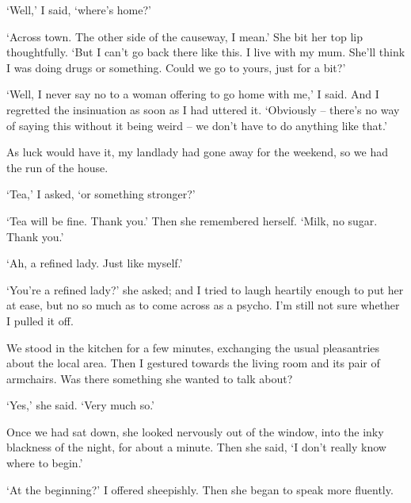 `Well,' I said, `where's home?'

`Across town. The other side of the causeway, I mean.' She bit her top lip thoughtfully. `But I can't go back there like this. I live with my mum. She'll think I was doing drugs or something. Could we go to yours, just for a bit?'

`Well, I never say no to a woman offering to go home with me,' I said. And I regretted the insinuation as soon as I had uttered it. `Obviously -- there's no way of saying this without it being weird -- we don't have to do anything like that.'

\divsep

As luck would have it, my landlady had gone away for the weekend, so we had the run of the house.

`Tea,' I asked, `or something stronger?'

`Tea will be fine. Thank you.' Then she remembered herself. `Milk, no sugar. Thank you.'

`Ah, a refined lady. Just like myself.'

`You're a refined lady?' she asked; and I tried to laugh heartily enough to put her at ease, but no so much as to come across as a psycho. I'm still not sure whether I pulled it off.

We stood in the kitchen for a few minutes, exchanging the usual pleasantries about the local area. Then I gestured towards the living room and its pair of armchairs. Was there something she wanted to talk about?

`Yes,' she said. `Very much so.'

Once we had sat down, she looked nervously out of the window, into the inky blackness of the night, for about a minute. Then she said, `I don't really know where to begin.'

`At the beginning?' I offered sheepishly. Then she began to speak more fluently.

